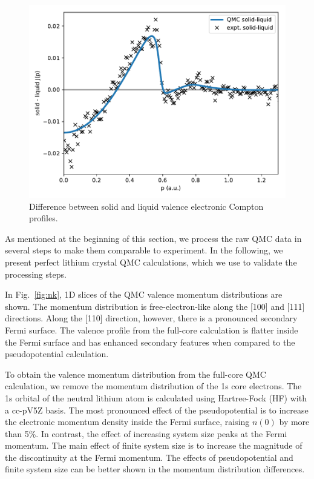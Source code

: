 \documentclass[aps,prb,showpacs,preprintnumbers,amsmath,amssymb,superscriptaddress,twocolumn]{revtex4-1}
\begin{document}
\begin{figure}[h]
\includegraphics[width=\linewidth]{li52e_sl-djp}
\caption{Difference between solid and liquid valence electronic Compton profiles.\label{fig:s-l-djp}}
\end{figure}

As mentioned at the beginning of this section, we process the raw QMC data in several steps to make them comparable to experiment. In the following, we present perfect lithium crystal QMC calculations, which we use to validate the processing steps.

In Fig.~\ref{fig:nk}, 1D slices of the QMC valence momentum distributions are shown. The momentum distribution is free-electron-like along the [100] and [111] directions. Along the [110] direction, however, there is a pronounced secondary Fermi surface. The valence profile from the full-core calculation is flatter inside the Fermi surface and has enhanced secondary features when compared to the pseudopotential calculation. 

To obtain the valence momentum distribution from the full-core QMC calculation, we remove the momentum distribution of the 1s core electrons. The 1s orbital of the neutral lithium atom is calculated using Hartree-Fock (HF) with a cc-pV5Z basis. The most pronounced effect of the pseudopotential is to increase the electronic momentum density inside the Fermi surface, raising $n(0)$ by more than 5\%. In contrast, the effect of increasing system size peaks at the Fermi momentum. The main effect of finite system size is to increase the magnitude of the discontinuity at the Fermi momentum. The effects of pseudopotential and finite system size can be better shown in the momentum distribution differences.
\end{document}
